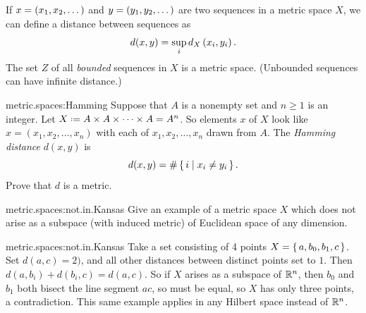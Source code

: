 \begin{example}
If \(x=\left(x_1, x_2, \dots\right)\) and \(y=\left(y_1, y_2, \dots\right)\) are two sequences in a metric space \(X\), we can define a distance between sequences as
\[
d(x,y)=\sup_i d_X\left(x_i,y_i\right).
\]
The set \(Z\) of all \emph{bounded} sequences in \(X\) is a metric space.
(Unbounded sequences can have infinite distance.)
\end{example}
\begin{problem}{metric.spaces:Hamming}
Suppose that \(A\) is a nonempty set and \(n \ge 1\) is an integer.
Let \(X\defeq A \times A \times \dots \times A=A^n\).
So elements \(x\) of \(X\) look like \(x=(x_1,x_2,\dots,x_n)\) with each of \(x_1,x_2,\dots,x_n\) drawn from \(A\).
The \emph{Hamming distance} \(d(x,y)\) is
\[
d(x,y)=\#\set{i|x_i\ne y_i}.
\]
Prove that \(d\) is a metric.
\end{problem}
\begin{problem}{metric.spaces:not.in.Kansas}
Give an example of a metric space \(X\) which does not arise as a subspace (with induced metric) of Euclidean space of any dimension.
\end{problem}
\begin{answer}{metric.spaces:not.in.Kansas}
Take a set consisting of 4 points \(X=\set{a,b_0,b_1,c}\).
Set \(d(a,c)=2)\), and all other distances between distinct points set to \(1\).
Then \(d(a,b_i)+d(b_i,c)=d(a,c)\).
So if \(X\) arises as a subspace of \(\mathbb{R}^{n}\), then \(b_0\) and \(b_1\) both bisect the line segment \(ac\), so must be equal, so \(X\) has only three points, a contradiction.
This same example applies in any Hilbert space instead of \(\mathbb{R}^{n}\).
\end{answer}


